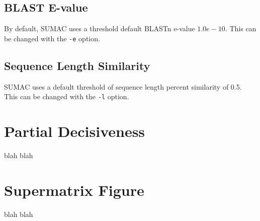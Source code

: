 \documentclass[12pt]{report}
\begin{document}
\subsection{BLAST E-value}
By default, SUMAC uses a threshold default BLASTn e-value $1.0e-10$.
This can be changed with the \verb|-e| option.

\subsection{Sequence Length Similarity}
SUMAC uses a default threshold of sequence length percent similarity
of 0.5. This can be changed with the \verb|-l| option.

\section{Partial Decisiveness}
blah blah

\section{Supermatrix Figure}
blah blah
\end{document}
